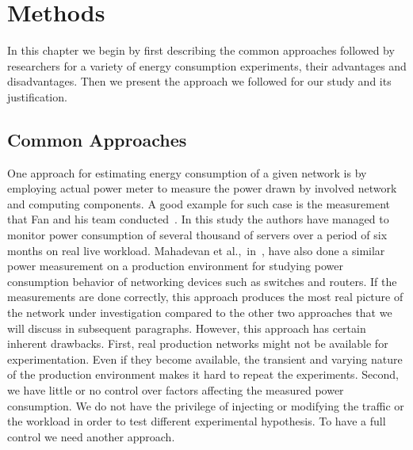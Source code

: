 \chapter{Methods}
\label{chapter:methods}

In this chapter we begin by first describing the common approaches followed by researchers for a variety of energy consumption experiments, their advantages and disadvantages. Then we present the approach we followed for our study and its justification.
\section{Common Approaches}
\label{section:commonappraoches}
One approach for estimating energy consumption of a given network is by employing actual power meter to measure the power drawn by involved network and computing components. A good example for such case is the measurement that Fan and his team conducted~\cite{DBLP:conf/isca/FanWB07}. In this study the authors have managed to monitor power consumption of several thousand of servers over a period of six months on real live workload. Mahadevan et al.,~in~\cite{DBLP:conf/networking/MahadevanSBR09}, have also done a similar power measurement on a production environment for studying power consumption behavior of networking devices such as switches and routers. If the measurements are done correctly, this approach produces the most real picture of the network under investigation compared to the other two approaches that we will discuss in subsequent paragraphs. However, this approach has certain inherent drawbacks. First, real production networks might not be available for experimentation. Even if they become available, the transient and varying nature of the production environment makes it hard to repeat the experiments. Second, we have little or no control over factors affecting the measured power consumption. We do not have the privilege of injecting or modifying the traffic or the workload in order to test different experimental hypothesis. To have a full control we need another approach. 

